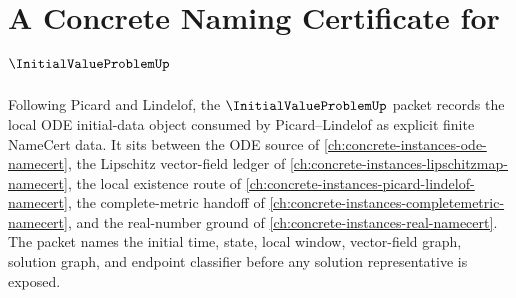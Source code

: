 \chapter{A Concrete Naming Certificate for $\InitialValueProblemUp$}
\label{ch:concrete-instances-initial-value-problem-namecert}

Following Picard and Lindelof, the $\InitialValueProblemUp$ packet records the local ODE initial-data object consumed by Picard--Lindelof as explicit finite NameCert data. It sits between the ODE source of \autoref{ch:concrete-instances-ode-namecert}, the Lipschitz vector-field ledger of \autoref{ch:concrete-instances-lipschitzmap-namecert}, the local existence route of \autoref{ch:concrete-instances-picard-lindelof-namecert}, the complete-metric handoff of \autoref{ch:concrete-instances-completemetric-namecert}, and the real-number ground of \autoref{ch:concrete-instances-real-namecert}. The packet names the initial time, state, local window, vector-field graph, solution graph, and endpoint classifier before any solution representative is exposed.

